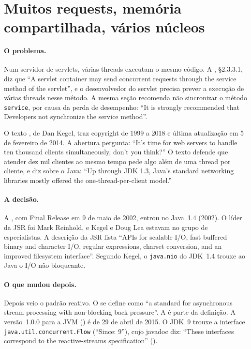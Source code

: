 \section{Muitos requests, memória compartilhada, vários núcleos}
\label{sec:muitos-requests}

\paragraph{O problema.}
Num servidor de servlets, várias threads executam o mesmo código. A
, §2.3.3.1, diz que
\enquote{A servlet container may send concurrent requests through the
service method of the servlet}, e o desenvolvedor do servlet precisa
prever a execução de várias threads nesse método. A mesma seção
recomenda não sincronizar o método \texttt{service}, por causa da
perda de desempenho: \enquote{It is strongly recommended that
Developers not synchronize the service method}.

O texto , de Dan Kegel, traz copyright de
1999 a 2018 e última atualização em 5 de fevereiro de 2014. A abertura pergunta: \enquote{It's
time for web servers to handle ten thousand clients simultaneously,
don't you think?} O texto defende que atender dez mil clientes ao mesmo
tempo pede algo além de uma thread por cliente, e diz sobre o Java:
\enquote{Up through JDK 1.3, Java's standard networking libraries
mostly offered the one-thread-per-client model.}

\paragraph{A decisão.}
A , com Final Release em 9 de maio de 2002, entrou
no Java~1.4 (2002). O líder da JSR foi Mark Reinhold, e Kegel e Doug
Lea estavam no grupo de especialistas. A descrição da JSR lista
\enquote{APIs for scalable I/O, fast buffered binary and character I/O,
regular expressions, charset conversion, and an improved filesystem
interface}. Segundo Kegel, o \texttt{java.nio} do JDK~1.4 trouxe ao
Java o I/O não bloqueante.

\paragraph{O que mudou depois.}
Depois veio o padrão reativo. O  se
define como \enquote{a standard for
asynchronous stream processing with non-blocking back pressure}. A
 é parte da definição. A
versão~1.0.0 para a JVM
() é de 29 de abril de 2015. O
JDK~9 trouxe a interface \texttt{java.util.concurrent.Flow}
(\enquote{Since: 9}), cujo javadoc diz: \enquote{These interfaces
correspond to the reactive-streams specification}
().

